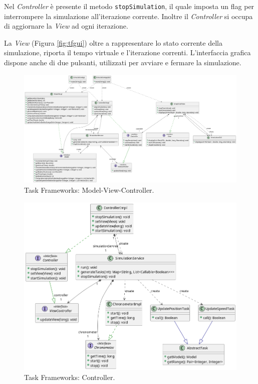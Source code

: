\documentclass[12pt,a4paper,openright,twoside]{book}
\begin{document}
Nel \textit{Controller} è presente il metodo \texttt{stopSimulation}, il quale imposta un flag per interrompere la simulazione all'iterazione corrente.
Inoltre il \textit{Controller} si occupa di aggiornare la \textit{View} ad ogni iterazione.

La \textit{View} (Figura \ref{fig:tfgui}) oltre a rappresentare lo stato corrente della simulazione, 
riporta il tempo virtuale e l'iterazione correnti.
L'interfaccia grafica dispone anche di due pulsanti, utilizzati per avviare e fermare la simulazione.
\begin{figure}[H]
	\centering
	\includegraphics[angle=90, height=\textheight]{figures/TFMVC-0.png}
	\caption{Task Frameworks: Model-View-Controller.}
	\label{fig:tfmvc}
\end{figure}
\begin{figure}[H]
	\centering
    \includegraphics[width=\textwidth]{figures/TFController-0.png}
	\caption{Task Frameworks: Controller.}
	\label{fig:tfc}
\end{figure}
\end{document}
